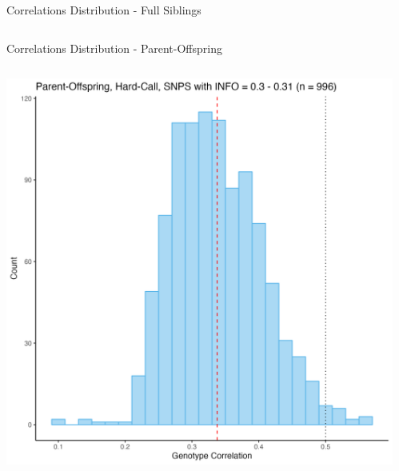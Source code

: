 \documentclass{beamer}
\begin{document}
\begin{frame}{Correlations Distribution - Full Siblings}
\begin{columns}
\begin{column}{0.5\textwidth}
            \end{column}
        \end{columns}
\end{frame}

\begin{frame}{Correlations Distribution - Parent-Offspring}
      \begin{columns}
            \begin{column}{0.5\textwidth}
                  \centering
                  \includegraphics[width= \textwidth]{fig/PO-HC-i30.png}
              \end{column}
            \begin{column}{0.5\textwidth}
                \centering

\end{column}
\end{columns}
\end{frame}
\end{document}
